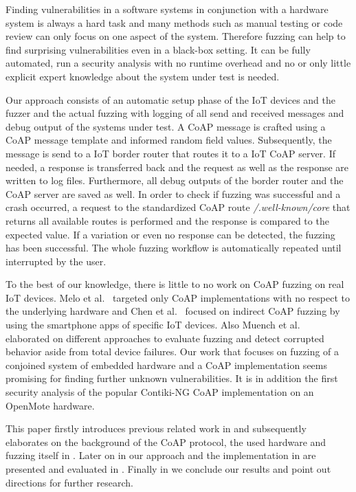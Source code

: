 Finding vulnerabilities in a software systems in conjunction with a hardware system is always a hard task and many methods such as manual testing or code review can only focus on one aspect of the system. Therefore fuzzing can help to find surprising vulnerabilities even in a black-box setting. It can be fully automated, run a security analysis with no runtime overhead and no or only little explicit expert knowledge about the system under test is needed.

Our approach consists of an automatic setup phase of the IoT devices and the fuzzer and the actual fuzzing with logging of all send and received messages and debug output of the systems under test. A CoAP message is crafted using a CoAP message template and informed random field values. Subsequently, the message is send to a IoT border router that routes it to a IoT CoAP server. If needed, a response is transferred back and the request as well as the response are written to log files. Furthermore, all debug outputs of the border router and the CoAP server are saved as well. In order to check if fuzzing was successful and a crash occurred, a request to the standardized CoAP route \textit{/.well-known/core} that returns all available routes is performed and the response is compared to the expected value. If a variation or even no response can be detected, the fuzzing has been successful. The whole fuzzing workflow is automatically repeated until interrupted by the user.

To the best of our knowledge, there is little to no work on CoAP fuzzing on real IoT devices. Melo et al.~\cite{Melo2017RobustnessTO} targeted only CoAP implementations with no respect to the underlying hardware and Chen et al.~\cite{chen2018ndss} focused on indirect CoAP fuzzing by using the smartphone apps of specific IoT devices. Also Muench et al.~\cite{EURECOM+5417} elaborated on different approaches to evaluate fuzzing and detect corrupted behavior aside from total device failures. Our work that focuses on fuzzing of a conjoined system of embedded hardware and a CoAP implementation seems promising for finding further unknown vulnerabilities. It is in addition the first security analysis of the popular Contiki-NG CoAP implementation on an OpenMote hardware.

This paper firstly introduces previous related work in  and subsequently elaborates on the background of the CoAP protocol, the used hardware and fuzzing itself in . Later on in  our approach and the implementation in  are presented and evaluated in . Finally in  we conclude our results and point out directions for further research.